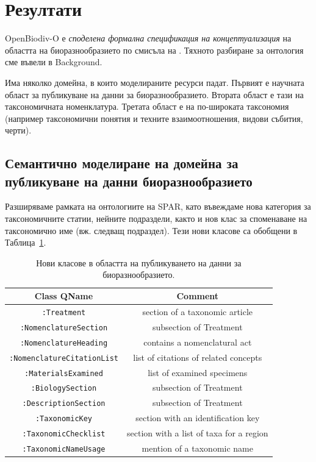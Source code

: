 \section{Резултати}

OpenBiodiv-O е \emph{споделена формална спецификация на концептуализация} на областта на биоразнообразието по смисъла на \cite{gruber_translation_1993, obitko_translations_2007, staab_handbook_2009}. Тяхното разбиране за онтология сме въвели в Background. 

Има няколко домейна, в които моделираните ресурси падат. Първият е научната област за публикуване на данни за биоразнообразието. Втората област е тази на таксономичната номенклатура. Третата област е на по-широката таксономия (например таксономични понятия и техните взаимоотношения, видови събития, черти).

\subsection{Семантично моделиране на домейна за публикуване на данни биоразнообразието}

Разширяваме рамката на онтологиите на SPAR, като въвеждаме нова категория за таксономичните статии, нейните подраздели, както и нов клас за споменаване на таксономично име (вж. следващ подраздел). Тези нови класове са обобщени в Таблица~\ref{bibliographic_classes}.

\begin{table}[h!]
\caption{Нови класове в областта на публикуването на данни за биоразнообразието.}
      \begin{tabular}{cc}
        \hline
          Class QName             & Comment\\  \hline
  {\tt :Treatment}                & section of a taxonomic article\\
  {\tt :NomenclatureSection}      & subsection of Treatment\\
  {\tt :NomenclatureHeading}      & contains a nomenclatural act \\
  {\tt :NomenclatureCitationList} & list of citations of related concepts\\
  {\tt :MaterialsExamined}        & list of examined specimens\\
  {\tt :BiologySection}           & subsection of Treatment\\
  {\tt :DescriptionSection}       & subsection of Treatment\\
  {\tt :TaxonomicKey}             & section with an identification key\\
  {\tt :TaxonomicChecklist}       & section with a list of taxa for a region\\ 
  {\tt :TaxonomicNameUsage}       & mention of a taxonomic name\\ \hline

      \end{tabular}
      \label{bibliographic_classes}
\end{table}

